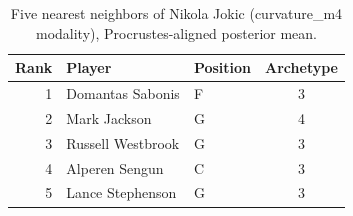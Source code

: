 \begin{table}[htbp]
  \centering\small
  \begin{tabular}{rllc}
    \toprule
    Rank & Player & Position & Archetype \\
    \midrule
    1 & Domantas Sabonis & F & 3 \\
    2 & Mark Jackson & G & 4 \\
    3 & Russell Westbrook & G & 3 \\
    4 & Alperen Sengun & C & 3 \\
    5 & Lance Stephenson & G & 3 \\
    \bottomrule
  \end{tabular}
  \caption{Five nearest neighbors of Nikola Jokic (curvature_m4 modality), Procrustes-aligned posterior mean.}
  \label{tab:Nikola_Jokic_neighbors_curvature_m4}
\end{table}

